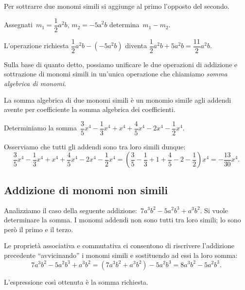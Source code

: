 \osservazione Per sottrarre due monomi simili si aggiunge al primo
l'opposto del secondo.

\begin{exrig}
 \begin{esempio}
Assegnati~$m_{{1}}=\dfrac{1}{2}a^{2}b$, $m_{2}=-\text{5a}^{2}b$ determina~$m_{1} - m_{2}$.

L'operazione richiesta
$\dfrac{1}{2}a^{2}b-(-5a^{2}b)$ diventa
$\dfrac{1}{2}a^{2}b+5a^{2}b=\dfrac{11}{2}a^{2}b$.
 \end{esempio}
\end{exrig}

Sulla base di quanto detto, possiamo unificare le due operazioni di
addizione e sottrazione di monomi simili in un'unica
operazione che chiamiamo \emph{somma algebrica di monomi}.

\osservazione La somma algebrica di due monomi simili è un monomio simile agli
addendi avente per coefficiente la somma algebrica dei coefficienti.

\begin{exrig}
 \begin{esempio}
Determiniamo la somma~$\dfrac{3}{5}x^{{4}}-\dfrac{1}{3}x^{{4}}+x^{{4}}+\dfrac{4}{5}x^{{4}}-2x^{{4}}-\dfrac{1}{2}x^{{4}}$.

Osserviamo che tutti gli addendi sono tra loro simili dunque:
\[\frac{3}{5}x^{{4}}-\frac{1}{3}x^{{4}}+x^{{4}}+\frac{4}{5}x^{{4}}-2x^{{4}}-\frac{1}{2}x^{{4}}=\left(\frac{3}{5}-\frac{1}{3}+1+\frac{4}{5}-2-\frac{1}{2}\right)x^{{4}}=-{\frac{13}{30}}x^{{4}}.\]
\end{esempio}
\end{exrig}
\subsection{Addizione di monomi non simili}

Analizziamo il caso della seguente
addizione:~$7a^{3}b^{2}-5a^{2}b^{3}+a^{3}b^{2}$. Si vuole determinare
la somma. I monomi addendi non sono tutti tra loro simili; lo sono
però il primo e il terzo.

Le proprietà associativa e commutativa ci consentono di riscrivere
l'addizione precedente
``avvicinando'' i monomi simili e
sostituendo ad essi la loro
somma:
\[7a^{3}b^{2}-5a^{2}b^{3}+a^{3}b^{2}=(7a^{3}b^{2}+a^{3}b^{2})-5a^{2}b^{3}=8a^{3}b^{2}-5a^{2}b^{3}.\]

L'espressione così ottenuta è la somma richiesta.


